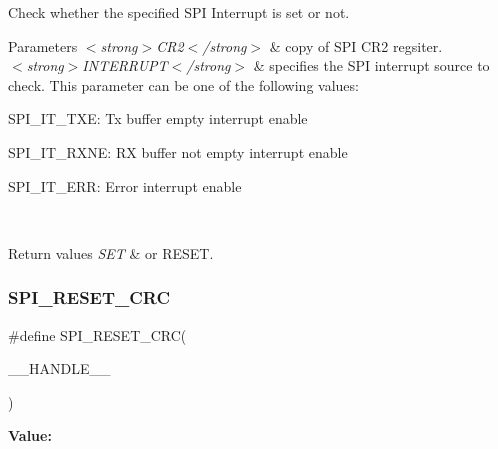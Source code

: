 Check whether the specified S\+PI Interrupt is set or not. 


\begin{DoxyParams}{Parameters}
{\em $<$strong$>$\+C\+R2$<$/strong$>$} & copy of S\+PI C\+R2 regsiter. \\
\hline
{\em $<$strong$>$\+I\+N\+T\+E\+R\+R\+U\+P\+T$<$/strong$>$} & specifies the S\+PI interrupt source to check. This parameter can be one of the following values\+: \begin{DoxyItemize}
\item S\+P\+I\+\_\+\+I\+T\+\_\+\+T\+XE\+: Tx buffer empty interrupt enable \item S\+P\+I\+\_\+\+I\+T\+\_\+\+R\+X\+NE\+: RX buffer not empty interrupt enable \item S\+P\+I\+\_\+\+I\+T\+\_\+\+E\+RR\+: Error interrupt enable \end{DoxyItemize}
\\
\hline
\end{DoxyParams}

\begin{DoxyRetVals}{Return values}
{\em S\+ET} & or R\+E\+S\+ET. \\
\hline
\end{DoxyRetVals}
\mbox{\label{group___s_p_i___private___macros_gab120a0085b72939e7d19c4f6b3381a99}} 
\subsubsection{\texorpdfstring{SPI\_RESET\_CRC}{SPI\_RESET\_CRC}}
{\footnotesize\ttfamily \#define S\+P\+I\+\_\+\+R\+E\+S\+E\+T\+\_\+\+C\+RC(\begin{DoxyParamCaption}\item[{}]{\+\_\+\+\_\+\+H\+A\+N\+D\+L\+E\+\_\+\+\_\+ }\end{DoxyParamCaption})}

{\bfseries Value\+:}
\begin{DoxyCode}{0}

\end{DoxyCode}


